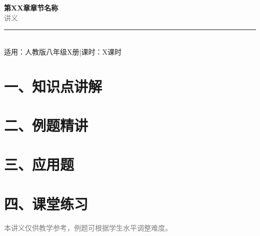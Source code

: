\documentclass[12pt, a4paper]{ctexart}
\begin{document}
\begin{center}
{\Huge\bfseries\textcolor{mainblue}{第XX章\quad 章节名称}}\\[12pt]
{\Large\textcolor{gray}{讲\quad 义}}\\[8pt]
\rule{0.6\textwidth}{1pt}\\[8pt]
{\normalsize 适用：人教版\quad 八年级X册\quad |\quad 课时：X课时}
\end{center}
\vspace{10pt}

\section*{\textcolor{mainblue}{一、知识点讲解}}


\section*{\textcolor{examorange}{二、例题精讲}}


\section*{\textcolor{apppurple}{三、应用题}}


\section*{\textcolor{tipgreen}{四、课堂练习}}


\vfill
\begin{center}
\small\textcolor{gray}{本讲义仅供教学参考，例题可根据学生水平调整难度。}
\end{center}
\end{document}
